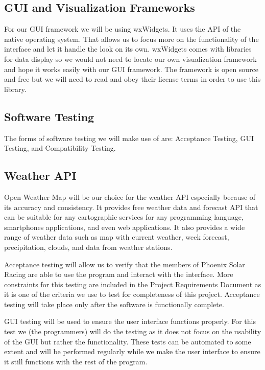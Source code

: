 \documentclass[onecolumn, draftclsnofoot,10pt, compsoc]{IEEEtran}
\begin{document}
\subsection{GUI and Visualization Frameworks}
For our GUI framework we will be using wxWidgets. 
It uses the API of the native operating system. 
That allows us to focus more on the functionality of the interface and let it handle the look on its own.
wxWidgets comes with libraries for data display so we would not need to locate our own visualization framework and hope it works easily with our GUI framework.
The framework is open source and free but we will need to read and obey their license terms in order to use this library.
\cite{wx}

\subsection{Software Testing}
The forms of software testing we will make use of are: Acceptance Testing, GUI Testing, and Compatibility Testing.
\cite{tutorials}

\subsection{Weather API}
Open Weather Map will be our choice for the weather API especially because of its accuracy and consistency. It provides free weather data and forecast API that can be suitable for any cartographic services for any programming language, smartphones applications, and even
web applications. It also provides a wide range of weather data such as map with current weather, week forecast, precipitation, clouds, and data from weather stations.

Acceptance testing will allow us to verify that the members of Phoenix Solar Racing are able to use the program and interact with the interface. 
More constraints for this testing are included in the Project Requirements Document as it is one of the criteria we use to test for completeness of this project.
Acceptance testing will take place only after the software is functionally complete. 

GUI testing will be used to ensure the user interface functions properly. 
For this test we (the programmers) will do the testing as it does not focus on the usability of the GUI but rather the functionality.
These tests can be automated to some extent and will be performed regularly while we make the user interface to ensure it still functions with the rest of the program.
\end{document}
